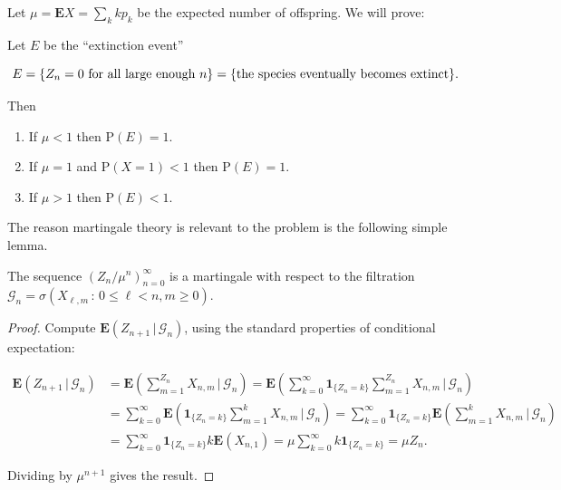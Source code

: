 Let $\mu=\mathbf{E} X = \sum_k k p_k$ be the expected
number of offspring. We will prove:

\begin{thm}
\label{thm-galton-watson}
Let $E$ be the ``extinction event''

\[
E = \{ Z_n=0 \textnormal{ for all large enough }n\} = \{ \textnormal{the species eventually becomes extinct} \}.
\]

\noindent Then

\begin{enumerate}[label=\arabic*.]
\item If $\mu< 1$ then $\mathrm{P}(E) = 1$.

\item If $\mu=1$ and $\mathrm{P}(X=1)<1$ then
$\mathrm{P}(E)=1$.

\item If $\mu>1$ then $\mathrm{P}(E)<1$.
\end{enumerate}

\end{thm}

\noindent The reason martingale theory is relevant to the
problem is the following simple lemma.

\begin{lem}
The sequence $(Z_n/\mu^n)_{n=0}^\infty$ is a
martingale with respect to the filtration
$\mathcal{G}_n = \sigma(X_{\ell,m}\,:\, 0\le \ell< n,
m\ge 0)$.
\end{lem}

\begin{proof}
Compute
$\mathbf{E}\left(Z_{n+1}\,|\,\mathcal{G}_n\right)$,
using the standard properties of conditional
expectation:

\begin{align*}
\mathbf{E}\left(Z_{n+1}\,|\,\mathcal{G}_n\right) &= \mathbf{E}\left(\sum_{m=1}^{Z_{n}} X_{n,m}\,|\,\mathcal{G}_n\right)
=
\mathbf{E}\left( \sum_{k=0}^\infty  \mathbf{1}_{\{Z_n=k\}} \sum_{m=1}^{Z_{n}} X_{n,m}\,|\,\mathcal{G}_n\right)
\\
&= \sum_{k=0}^\infty
\mathbf{E}\left( \mathbf{1}_{\{Z_n=k\}} \sum_{m=1}^{k} X_{n,m}\,|\,\mathcal{G}_n\right)
= \sum_{k=0}^\infty \mathbf{1}_{\{Z_n=k\}}
\mathbf{E}\left(  \sum_{m=1}^{k} X_{n,m}\,|\,\mathcal{G}_n\right) \\
&=
\sum_{k=0}^\infty \mathbf{1}_{\{Z_n=k\}} k \mathbf{E}(X_{n,1}) = \mu \sum_{k=0}^\infty k \mathbf{1}_{\{Z_n=k\}} = \mu Z_n.
\end{align*}

\noindent Dividing by $\mu^{n+1}$ gives the result.
\end{proof}

